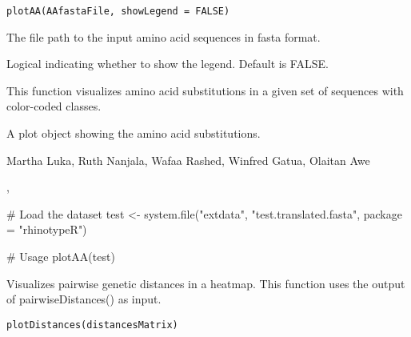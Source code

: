 \documentclass[a4paper]{book}
\begin{document}
%
\begin{Usage}
\begin{verbatim}
plotAA(AAfastaFile, showLegend = FALSE)
\end{verbatim}
\end{Usage}
%
\begin{Arguments}
\begin{ldescription}
\item[\code{AAfastaFile}] 
The file path to the input amino acid sequences in fasta format.

\item[\code{showLegend}] 
Logical indicating whether to show the legend. Default is FALSE.

\end{ldescription}
\end{Arguments}
%
\begin{Details}
This function visualizes amino acid substitutions in a given set of sequences with color-coded classes.
\end{Details}
%
\begin{Value}
A plot object showing the amino acid substitutions.
\end{Value}
%
\begin{Author}
Martha Luka, Ruth Nanjala, Wafaa Rashed, Winfred Gatua, Olaitan Awe 
\end{Author}
%
\begin{SeeAlso}
,
\end{SeeAlso}
%
\begin{Examples}
\begin{ExampleCode}
# Load the dataset
test <- system.file("extdata", "test.translated.fasta", package = "rhinotypeR")

# Usage
plotAA(test)
\end{ExampleCode}
\end{Examples}
%
\begin{Description}
Visualizes pairwise genetic distances in a heatmap. 
This function uses the output of pairwiseDistances() as input.
\end{Description}
%
\begin{Usage}
\begin{verbatim}
plotDistances(distancesMatrix)
\end{verbatim}
\end{Usage}
\end{document}
